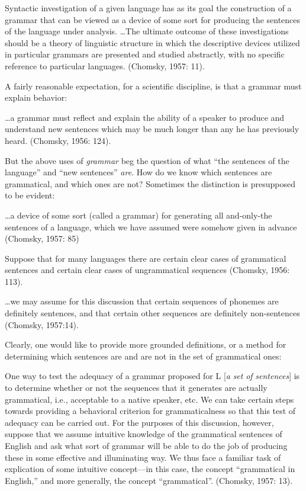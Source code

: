 Syntactic investigation of a given language has as its goal the construction of a grammar that can be viewed as a device of some sort for producing the sentences of the language under analysis. …The ultimate outcome of these investigations should be a theory of linguistic structure in which the descriptive devices utilized in particular grammars are presented and studied abstractly, with no specific reference to particular languages. (Chomsky, 1957: 11).

A fairly reasonable expectation, for a scientific discipline, is that a grammar must explain behavior:

…a grammar must reflect and explain the ability of a speaker to produce and understand new sentences which may be much longer than any he has previously heard. (Chomsky, 1956: 124).

  But the above uses of \textit{grammar} beg the question of what “the sentences of the language” and “new sentences” \textit{are}. How do we know which sentences are grammatical, and which ones are not? Sometimes the distinction is presupposed to be evident:

…a device of some sort (called a grammar) for generating all and-only-the sentences of a language, which we have assumed were somehow given in advance (Chomsky, 1957: 85)

Suppose that for many languages there are certain clear cases of grammatical sentences and certain clear cases of ungrammatical sequences (Chomsky, 1956: 113).

…we may assume for this discussion that certain sequences of phonemes are definitely sentences, and that certain other sequences are definitely non-sentences (Chomsky, 1957:14).

Clearly, one would like to provide more grounded definitions, or a method for determining which sentences are and are not in the set of grammatical ones:

One way to test the adequacy of a grammar proposed for L [\textit{a} \textit{set} \textit{of} \textit{sentences}] is to determine whether or not the sequences that it generates are actually grammatical, i.e., acceptable to a native speaker, etc. We can take certain steps towards providing a behavioral criterion for grammaticalness so that this test of adequacy can be carried out. For the purposes of this discussion, however, suppose that we assume intuitive knowledge of the grammatical sentences of English and ask what sort of grammar will be able to do the job of producing these in some effective and illuminating way. We thus face a familiar task of explication of some intuitive concept—in this case, the concept “grammatical in English,” and more generally, the concept “grammatical”. (Chomsky, 1957: 13).


